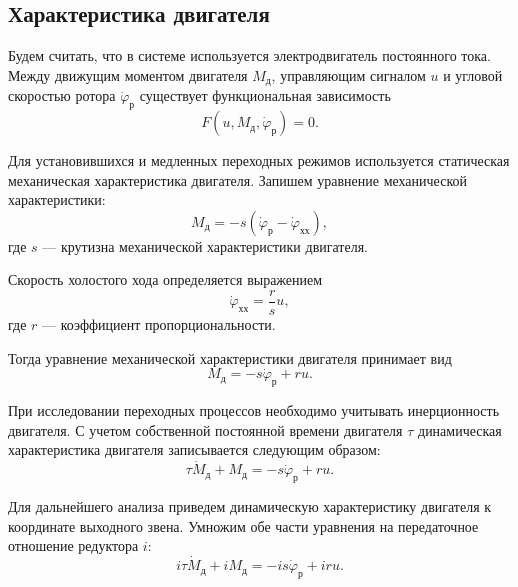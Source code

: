 \subsection{Характеристика двигателя}

Будем считать, что в системе используется электродвигатель постоянного тока. Между движущим моментом двигателя $M_{\text{д}}$, управляющим сигналом $u$ и угловой скоростью ротора $\dot{\varphi}_{\text{р}}$ существует функциональная зависимость
\begin{equation}
    F(u, M_{\text{д}}, \dot{\varphi}_{\text{р}})=0.
\end{equation}

Для установившихся и медленных переходных режимов используется статическая механическая характеристика двигателя. Запишем уравнение механической характеристики:
\begin{equation}
    M_{\text{д}}
    =
    -s
    \left(
        \dot{\varphi}_{\text{р}}
        -
        \dot{\varphi}_{\text{хх}}
    \right),
\end{equation}
где $s$ --- крутизна механической характеристики двигателя.

Скорость холостого хода определяется выражением
\begin{equation}
    \dot{\varphi}_{\text{хх}}
    =
    \frac{r}{s}u,
\end{equation}
где $r$ --- коэффициент пропорциональности.

Тогда уравнение механической характеристики двигателя принимает вид
\begin{equation}
    M_{\text{д}}
    =
    -s \dot{\varphi}_{\text{р}}
    +
    r u.
\end{equation}

При исследовании переходных процессов необходимо учитывать инерционность двигателя. С учетом собственной постоянной времени двигателя $\tau$ динамическая характеристика двигателя записывается следующим образом:
\begin{equation}
    \tau \dot{M}_{\text{д}}
    +
    M_{\text{д}}
    =
    -s \dot{\varphi}_{\text{р}}
    +
    r u.
\end{equation}

Для дальнейшего анализа приведем динамическую характеристику двигателя к координате выходного звена. Умножим обе части уравнения на передаточное отношение редуктора $i$:
\begin{equation}
    i \tau \dot{M}_{\text{д}}
    +
    i M_{\text{д}}
    =
    -i s \dot{\varphi}_{\text{р}}
    +
    i r u.
\end{equation}

